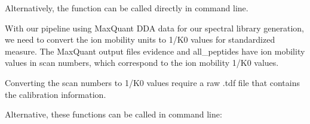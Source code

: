 \documentclass[letterpaper,10pt,english]{sphinxmanual}
\begin{document}
Alternatively, the function can be called directly in command line.

\begin{sphinxVerbatim}[commandchars=\\\{\}]
  
\end{sphinxVerbatim}

With our pipeline using MaxQuant DDA data for our spectral library generation, we need
to convert the ion mobility units to 1/K0 values for standardized measure. The MaxQuant
output files evidence and all\_peptides have ion mobility values in scan numbers, which
correspond to the ion mobility 1/K0 values.

Converting the scan numbers to 1/K0 values require a raw .tdf file that contains the
calibration information.

\begin{sphinxVerbatim}[commandchars=\\\{\}]
   
  
  

  

  
\end{sphinxVerbatim}

Alternative, these functions can be called in command line:

\begin{sphinxVerbatim}[commandchars=\\\{\}]
   
\end{sphinxVerbatim}
\end{document}
